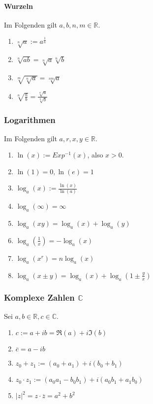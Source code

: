 \documentclass[a4paper, 9pt, DIV=24]{scrartcl}
\begin{document}
\paragraph{Wurzeln} Im Folgenden gilt $a,b,n,m \in\mathbb{R}$.
\begin{enumerate}[label={(}\arabic*{)}]
 \item $\sqrt[n]{a} := a^{\frac{1}{n}}$
 \item $\sqrt[n]{ab} = \sqrt[n]{a}\sqrt[n]{b}$
 \item $\sqrt[m]{\sqrt[n]{a}} = \sqrt[nm]{a}$
 \item $\sqrt[n]{\frac{a}{b}} = \frac{\sqrt[n]{a}}{\sqrt[n]{b}}$
\end{enumerate}

\subsubsection{Logarithmen} Im Folgenden gilt $a,r,x,y \in\mathbb{R}$.
\begin{enumerate}[label={(}\arabic*{)}]
 \item $\ln(x) := Exp^{-1}(x)$, also $x > 0$.
 \item $\ln(1) = 0, \ln(e) = 1$
 \item $\log_a(x) := \frac{\ln(x)}{\ln(a)}$
 \item $\log_a(\infty) = \infty$
 \item $\log_a(xy) = \log_a(x)+\log_a(y)$
 \item $\log_a(\frac{1}{x}) = -\log_a(x)$
 \item $\log_a(x^r) = n\log_a(x)$
 \item $\log_a(x \pm y) = \log_a(x) + \log_a(1 \pm \frac{y}{x})$
\end{enumerate}

\subsubsection{Komplexe Zahlen $\mathbb{C}$}
Sei $a,b \in \mathbb{R}, c \in \mathbb{C}$.
\begin{enumerate}[label={(}\arabic*{)}]
 \item $c := a + ib = \Re(a) + i\Im(b)$
 \item $\overline{c} = a - ib$
 \item $z_0 + z_1 := (a_0 + a_1) + i(b_0 + b_1)$
 \item $z_0 \cdot z_1 := (a_0a_1 - b_0b_1) + i(a_0b_1 + a_1b_0)$
 \item $|z|^2 = z\cdot\overline{z} = a^2 + b^2$
\end{enumerate}
\end{document}
